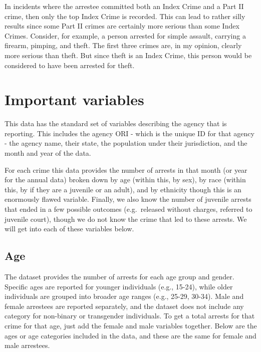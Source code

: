\documentclass[
]{krantz}
\begin{document}
In incidents where the arrestee committed both an Index
Crime and a Part II crime, then only the top Index Crime is
recorded. This can lead to rather silly results since some
Part II crimes are certainly more serious than some Index
Crimes. Consider, for example, a person arrested for simple
assault, carrying a firearm, pimping, and theft. The first
three crimes are, in my opinion, clearly more serious than
theft. But since theft is an Index Crime, this person would
be considered to have been arrested for theft.

\section{Important variables}\label{important-variables-2}

This data has the standard set of variables describing the
agency that is reporting. This includes the agency ORI -
which is the unique ID for that agency - the agency name,
their state, the population under their jurisdiction, and
the month and year of the data.

For each crime this data provides the number of arrests in
that month (or year for the annual data) broken down by age
(within this, by sex), by race (within this, by if they are
a juvenile or an adult), and by ethnicity though this is an
enormously flawed variable. Finally, we also know the number
of juvenile arrests that ended in a few possible outcomes
(e.g.~released without charges, referred to juvenile court),
though we do not know the crime that led to these arrests.
We will get into each of these variables below.

\subsection{Age}\label{age}

The dataset provides the number of arrests for each age
group and gender. Specific ages are reported for younger
individuals (e.g., 15-24), while older individuals are
grouped into broader age ranges (e.g., 25-29, 30-34). Male
and female arrestees are reported separately, and the
dataset does not include any category for non-binary or
transgender individuals. To get a total arrests for that
crime for that age, just add the female and male variables
together. Below are the ages or age categories included in
the data, and these are the same for female and male
arrestees.
\end{document}
